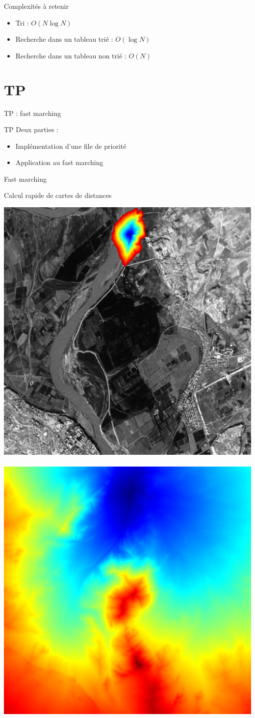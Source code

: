 \begin{frame}{Complexités à retenir}

\begin{itemize}
\item Tri : $O(N \log N)$
\item Recherche dans un tableau trié : $O(\log N)$
\item Recherche dans un tableau non trié : $O(N)$
\end{itemize}

\end{frame}

\section{TP}

\begin{frame}{TP : fast marching}

\begin{block}{TP}
Deux parties :
\begin{itemize}
\item Implémentation d'une file de priorité
\item Application au fast marching
\end{itemize}
\end{block}
\end{frame}

\begin{frame}{Fast marching}

\begin{block}{Calcul rapide de cartes de distances}
\centering

\vspace{1cm}
\includegraphics[width=0.4\linewidth]{images/road2-propagation-005.png}~~~
\includegraphics[width=0.4\linewidth]{images/road2-propagation-013.png}
\end{block}
\end{frame}

